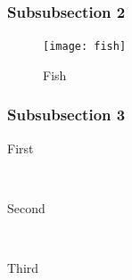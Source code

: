 \documentclass[12pt]{article}
\begin{document}
\subsubsection{Subsubsection 2} %

\lipsum[6] %
\begin{figure} %
  \begin{center}
    \texttt{[image: fish]}
  \end{center}
  \caption{Fish}
\end{figure}
\lipsum[7-8] %


\subsubsection{Subsubsection 3} %

\begin{description} %

\item[First] \hfill \\
\lipsum[9] %

\item[Second] \hfill \\
\lipsum[10] %

\item[Third] \hfill \\
\lipsum[11] %

\end{description} 





\end{document}
